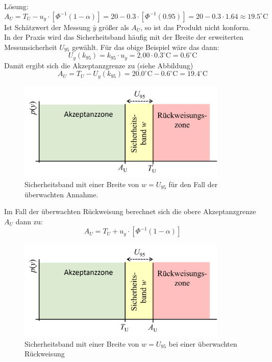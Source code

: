 Lösung: \\
\[
A_U = T_U - u_y \cdot [\Phi^{-1}(1-\alpha)] = 20 -0.3 \cdot [\Phi^{-1}(0.95)] = 20 - 0.3\cdot 1.64 \approx 19.5^{\circ}\mathrm{C}
\]
Ist Schätzwert der Messung $\bar y$ größer als $A_U$, so ist das Produkt nicht konform.\\
In der Praxis wird das Sicherheitsband häufig mit der Breite der erweiterten Messunsicherheit $U_{95}$ gewählt. Für das obige Beispiel wäre das dann: 
\[
U_y(k_{95}) = k_{95} \cdot u_y = 2.00  \cdot 0.3 ^{\circ}\mathrm{C} = 0.6^{\circ}\mathrm{C}
\]
Damit ergibt sich die Akzeptanzgrenze zu (siehe Abbildung)
\[
A_U = T_U -U_y(k_{95}) = 20.0 ^{\circ}\mathrm{C} - 0.6 ^{\circ}\mathrm{C} = 19.4 ^{\circ}\mathrm{C}
\] 
\begin{figure}[!htb]	
	\begin{center}
		\includegraphics[width=100mm]{06_vorlesung/media/Sicherheitsband_Ueberwachte_Annahme.png}
		\caption{Sicherheitsband mit einer Breite von $w=U_{95}$ für den Fall der überwachten Annahme.}
		\label{fig:Sicherheitsband_Breite_2sigma}
	\end{center}
\end{figure}
Im Fall der überwachten Rückweisung berechnet sich die obere Akzeptanzgrenze $A_U$ dann zu:
\[
A_U = T_U + u_y \cdot [\Phi^{-1}(1-\alpha)]
\]
\begin{figure}[!htb]	
	\begin{center}
		\includegraphics[width=100mm]{06_vorlesung/media/Sicherheitsband_Ueberwachte_Rueckweisung.png}
		\caption{Sicherheitsband mit einer Breite von $w=U_{95}$ bei einer überwachten Rückweisung}
		\label{fig:Sicherheitsband_Breite_2sigma_Rueckweisung}
	\end{center}
\end{figure}

